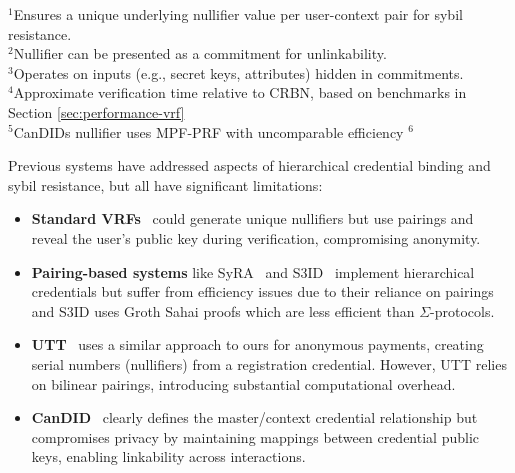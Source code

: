 \begin{table}
\begin{center}
\begin{tabular}{l|cccccc}
\bottomrule
\end{tabular}
\end{center}
\vspace{1em}
\footnotesize{$^1$Ensures a unique underlying nullifier value per user-context pair for sybil resistance.} \\
\footnotesize{$^2$Nullifier can be presented as a commitment for unlinkability.} \\
\footnotesize{$^3$Operates on inputs (e.g., secret keys, attributes) hidden in commitments.} \\
\footnotesize{$^4$Approximate verification time relative to CRBN, based on benchmarks in Section \ref{sec:performance-vrf}} \\
\footnotesize{$^5$CanDIDs nullifier uses MPF{-}PRF with uncomparable efficiency}
\footnotesize{$^6$}
\end{table}

Previous systems have addressed aspects of hierarchical credential binding and sybil resistance, but all have significant limitations:

\begin{itemize}
    
    \item \textbf{Standard VRFs}~\cite{hutchison_verifiable_2005, goldberg_nsec5_2015} could generate unique nullifiers but use pairings and reveal the user's public key during verification, compromising anonymity.
        
    \item \textbf{Pairing-based systems} like SyRA~\cite{crites_syra_2024} and S3ID~\cite{rabaninejad_attribute-based_2024} implement hierarchical credentials but suffer from efficiency issues due to their reliance on pairings and S3ID uses Groth Sahai proofs which are less efficient than $\Sigma$-protocols.
    
    \item \textbf{UTT}~\cite{tomescu_utt_2022} uses a similar approach to ours for anonymous payments, creating serial numbers (nullifiers) from a registration credential. However, UTT relies on bilinear pairings, introducing substantial computational overhead.
    
    \item \textbf{CanDID}~\cite{maram_candid_2020} clearly defines the master/context credential relationship but compromises privacy by maintaining mappings between credential public keys, enabling linkability across interactions.

\end{itemize}


